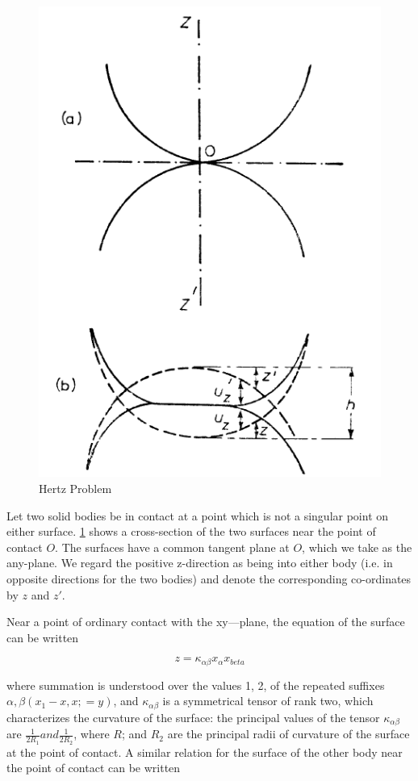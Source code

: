\begin{figure}[H]
\includegraphics[scale=0.50]{../images/Intro/hertz.png}
\caption{Hertz Problem}
\label{fig:hertzfigure}
\end{figure}

Let two solid bodies be in contact at a point which is not a singular point on either surface. \ref{fig:hertzfigure} shows a cross-section of the two surfaces near the point of contact $O$. The surfaces have a common tangent plane at $O$, which we take as the any-plane. We regard the positive z-direction as being into either body (i.e. in opposite directions for the two bodies) and denote the corresponding co-ordinates by $z$ and $z'$.

Near a point of ordinary contact with the xy—plane, the equation of the surface can be written

\begin{equation}
z = \kappa_{\alpha\beta}x_{\alpha}x_{beta}
\label{eq:contacteq1}
\end{equation}

where summation is understood over the values 1, 2, of the repeated suffixes $\alpha, \beta (x_{1} - x, x; = y)$, and $\kappa_{\alpha\beta}$ is a symmetrical tensor of rank two, which characterizes the curvature of the surface: the principal values of the tensor $\kappa_{\alpha\beta}$ are $\frac{1}{2R_{1}} and \frac{1}{2R_{2}}$, where $R$; and $R_{2}$ are the principal radii of curvature
of the surface at the point of contact. A similar relation for the surface of the other body near the point of contact can be written

